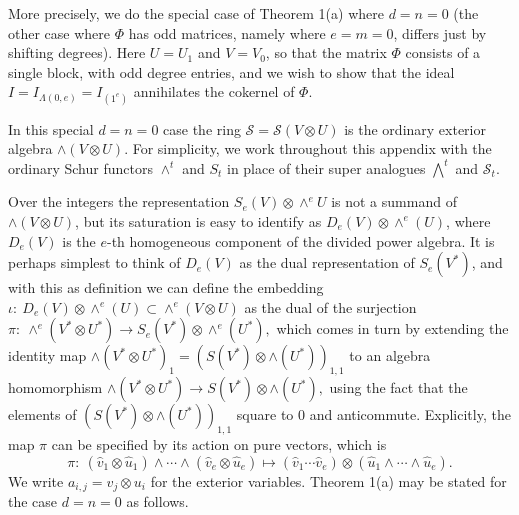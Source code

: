 \documentclass{tran-l}
\theoremstyle{plain}
\theoremstyle{remark}
\theoremstyle{definition}
\newcommand{\myS}{{\mathcal S}}
\begin{document}
More precisely, we do the
special case of Theorem 1(a)
where $d=n=0$ (the other case where $\Phi $
has odd matrices, namely where $e=m=0$, differs just
by shifting degrees). Here $U=U_{1}$ and
$V=V_{0}$, so that the matrix
$\Phi $ consists of a single block, with odd degree entries,
and we wish to show that the ideal $I=I_{\Lambda (0,e)}=I_{(1^{e})}$
annihilates the cokernel of $\Phi $. 

In this special $d=n=0$ case the ring $\myS =\myS (V\otimes U)$ is the ordinary
exterior algebra $\wedge (V\otimes U)$.  For simplicity, we work throughout
this appendix with the ordinary Schur functors $\wedge ^{t}$ and $S_{t}$ in
place of their super analogues $\bigwedge ^{t}$ and $\myS _{t}$. 

Over the integers the representation 
$S_{e}(V)\otimes \wedge ^{e} U$ is not a summand of $\wedge (V\otimes U)$,
but its saturation is easy to identify as $D_{e}(V)\otimes \wedge ^{e}(U)$,
where $D_{e}(V)$ is the $e$-th homogeneous component of the 
divided power algebra. It is perhaps simplest to think of
$D_{e}(V)$ as the dual representation of $S_{e}(V^{*})$, and with this
as definition we can define the embedding 
$\iota :\ D_{e}(V)\otimes \wedge ^{e}(U)\subset \wedge ^{e}(V\otimes U)
$
as the dual of the surjection 
$\pi :\ \wedge ^{e}(V^{*}\otimes U^{*}) \to S_{e}(V^{*})\otimes \wedge ^{e}(U^{*}),
$
which comes in turn by extending the identity map
$\wedge (V^{*}\otimes U^{*})_{1} = (S(V^{*})\otimes \wedge (U^{*}))_{1,1}
$
to an algebra homomorphism
$\wedge (V^{*}\otimes U^{*})\to S(V^{*})\otimes \wedge (U^{*}),
$
using the fact that the elements of 
$(S(V^{*})\otimes \wedge (U^{*}))_{1,1}$
square to 0 and anticommute. Explicitly, the map $\pi $ 
can be specified
by its action on pure vectors, which is
\begin{equation*}\pi : \ 
(\hat v_{1} \otimes \hat u_{1}) \wedge \cdots \wedge (\hat v_{e} \otimes \hat u_{e})
\mapsto (\hat v_{1} \cdots \hat v_{e})\otimes (\hat u_{1}\wedge \cdots \wedge \hat u_{e}).
\end{equation*}
We write
$a_{i,j}=v_{j}\otimes u_{i}$ for the exterior variables.
Theorem 1(a) may be stated 
for the case $d=n=0$ as follows.
\end{document}
